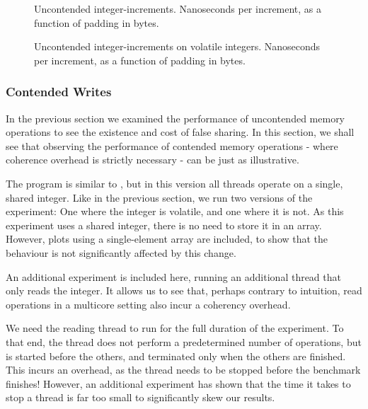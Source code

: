 \begin{figure}[hbpt]
\graphicspath{{plots/}}

\caption{Uncontended integer-increments. Nanoseconds per increment, as a
function of padding in bytes.}
\label{fig:uncont}
\end{figure}

\begin{figure}[hbpt]
\graphicspath{{plots/}}

\caption{Uncontended integer-increments on volatile integers. Nanoseconds per
increment, as a function of padding in bytes.}
\label{fig:uncont-nob}
\end{figure}


\subsubsection{Contended Writes}

In the previous section we examined the performance of uncontended memory
operations to see the existence and cost of false sharing. In this section, we
shall see that observing the performance of contended memory operations - where
coherence overhead is strictly necessary - can be just as illustrative.


The program is similar to , but in this version all threads operate on a single, shared integer. Like in the previous
section, we run two versions of the experiment: One where the integer is
volatile, and one where it is not. As this experiment uses a shared integer,
there is no need to store it in an array. However, plots using a single-element
array are included, to show that the behaviour is not significantly affected by
this change.

An additional experiment is included here, running an additional thread that
only reads the integer. It allows us to see that, perhaps contrary to intuition,
read operations in a multicore setting also incur a coherency overhead.


We need the reading thread to run for the full duration of the experiment. To
that end, the thread does not perform a predetermined number of operations, but
is started before the others, and terminated only when the others are
finished. This incurs an overhead, as the thread needs to be stopped before the
benchmark finishes! However, an additional experiment has shown that the time it
takes to stop a thread is far too small to significantly skew our results.

